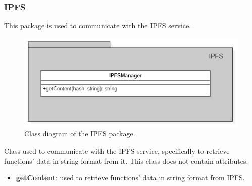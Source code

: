 	\subsubsection{IPFS}
	This package is used to communicate with the IPFS service.
	\begin{figure} [h!]
		\centering
		\includegraphics[width=0.8\linewidth]{diagrammi/etherless-server/IPFS}
		\caption{Class diagram of the IPFS package.}
	\end{figure}
	Class used to communicate with the IPFS service, specifically to retrieve functions' data in string format from it.
	This class does not contain attributes.
	\begin{itemize}
		\item \textbf{getContent}: used to retrieve functions' data in string format from IPFS.
	\end{itemize}
